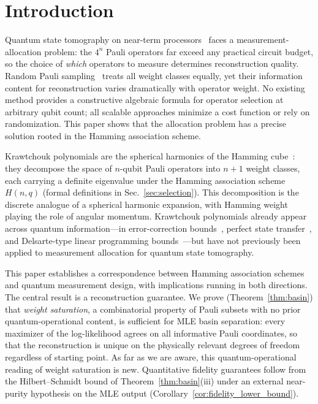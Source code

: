 \documentclass[twocolumn,prx,aps,superscriptaddress,longbibliography,floatfix]{revtex4-2}
\newcommand{\pclaim}[4]{}
\begin{document}

\maketitle

\section{Introduction}
\label{sec:intro}

Quantum state tomography on near-term
processors~\cite{Vogel1989,James2001,Haah2017,Huang2020}
faces a measurement-allocation problem: the $4^n$ Pauli
operators far exceed any practical circuit budget, so the
choice of \emph{which} operators to measure determines
reconstruction quality.
Random Pauli sampling~\cite{Aaronson2018,Huang2020,Elben2023}
treats all weight classes equally, yet their information content
for reconstruction varies dramatically with operator weight.
No existing method provides a constructive algebraic formula
for operator selection at arbitrary qubit count; all scalable
approaches minimize a cost function or rely on randomization.
This paper shows that the allocation problem has a precise
solution rooted in the Hamming association scheme.

Krawtchouk polynomials are the spherical harmonics of the
Hamming cube~\cite{Delsarte1973}: they decompose the space of
$n$-qubit Pauli operators into $n + 1$ weight classes, each
carrying a definite eigenvalue under the Hamming association
scheme $H(n,q)$ (formal definitions in
Sec.~\ref{sec:selection}).
This decomposition is the discrete analogue of a spherical
harmonic expansion, with Hamming weight playing the role of
angular momentum.
Krawtchouk polynomials already appear across quantum
information---in error-correction
bounds~\cite{Ashikhmin2001,Rains1999}, perfect state
transfer~\cite{Vinet2012}, and Delsarte-type linear programming
bounds~\cite{MacWilliams1977,Okada2025}---but have not
previously been applied to measurement allocation for quantum
state tomography.

This paper establishes a correspondence between Hamming
association schemes and quantum measurement design, with
implications running in both directions.
The central result is a reconstruction guarantee.
\pclaim{prose:intro:basin}{proved}{*}{thm:basin}%
We prove (Theorem~\ref{thm:basin}) that \emph{weight saturation},
a combinatorial property of Pauli subsets with no prior
quantum-operational content, is sufficient for MLE basin
separation: every maximizer of the log-likelihood agrees on all
informative Pauli coordinates, so that the reconstruction is
unique on the physically relevant degrees of freedom regardless
of starting point.
As far as we are aware, this quantum-operational reading of weight
saturation is new.
Quantitative fidelity guarantees follow from the Hilbert--Schmidt
bound of Theorem~\ref{thm:basin}(iii) under an external near-purity
hypothesis on the MLE output (Corollary~\ref{cor:fidelity_lower_bound}).
\end{document}
